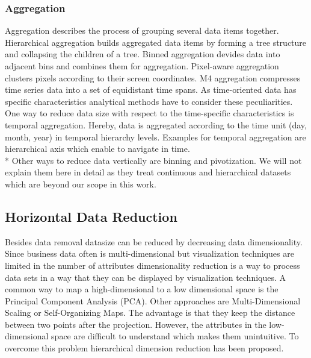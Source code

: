\subsubsection*{Aggregation}
Aggregation describes the process of grouping several data items together. Hierarchical aggregation builds aggregated data items by forming a tree structure and collapsing the children of a tree\cite{elmqvist2010hierarchical}. Binned aggregation devides data into adjacent bins and combines them for aggregation\cite{Liu2013}. Pixel-aware aggregation clusters pixels according to their screen coordinates\cite{li2016polyspector}. M4 aggregation compresses time series data into a set of equidistant time spans\cite{jugel2014m4}.
As time-oriented data has specific characteristics analytical methods have to consider these peculiarities. One way to reduce data size with respect to the time-specific characteristics is temporal aggregation. Hereby, data is aggregated according to the time unit (day, month, year) in temporal hierarchy levels. Examples for temporal aggregation are hierarchical axis \cite{Chung2014} which enable to navigate in time. 
\\*
Other ways to reduce data vertically are binning and pivotization. We will not explain them here in detail as they treat continuous and hierarchical datasets which are beyond our scope in this work. 

\subsection{Horizontal Data Reduction}
Besides data removal datasize can be reduced by decreasing data dimensionality. Since business data often is multi-dimensional but visualization techniques are limited in the number of attributes dimensionality reduction is a way to process data sets in a way that they can be displayed by visualization techniques. 
A common way to map a high-dimensional to a low dimensional space is the Principal Component Analysis (PCA)\cite{Aigner2008}. Other approaches are Multi-Dimensional Scaling or Self-Organizing Maps\cite{PiringerHarald2011}. The advantage is that they keep the distance between two points after the projection. However, the attributes in the low-dimensional space are difficult to understand which makes them unintuitive. To overcome this problem hierarchical dimension reduction has been proposed. 



